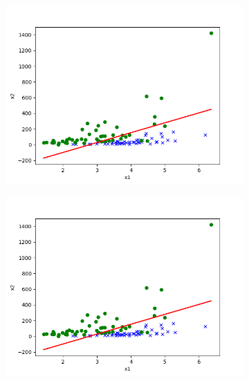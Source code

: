   
\begin{answer}
\begin{figure}[htbp]
    \begin{subfigure}[b]{0.5\linewidth}
        \centering
        \includegraphics[width=\linewidth]{p01b_pred_1_txt.png}
    \end{subfigure}
    \begin{subfigure}[b]{0.5\linewidth}
        \centering
        \includegraphics[width=\linewidth]{p01e_pred_1_txt.png}
    \end{subfigure}

\end{figure}

\end{answer}